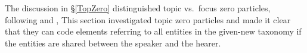 The discussion in \S \ref{TopZero} distinguished topic vs.~focus zero particles,
following  and ,
This section investigated topic zero particles and made it clear
that they can code elements referring to all entities in the given-new taxonomy
if the entities are shared between the speaker and the hearer.


%
%
%
